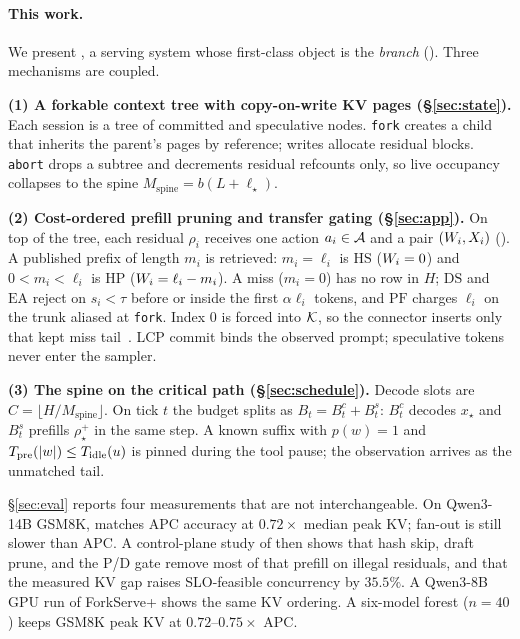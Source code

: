 \paragraph{This work.}
We present \sys, a serving system whose first-class object is the \emph{branch} ().
Three mechanisms are coupled.

\smallskip\noindent\textbf{(1) A forkable context tree with copy-on-write KV pages (\S\ref{sec:state}).}
Each session is a tree of committed and speculative nodes.
\texttt{fork} creates a child that inherits the parent's pages by reference; writes allocate residual blocks.
\texttt{abort} drops a subtree and decrements residual refcounts only, so live occupancy collapses to the spine $M_{\mathrm{spine}}=b(L+\ell_\star)$.

\smallskip\noindent\textbf{(2) Cost-ordered prefill pruning and transfer gating (\S\ref{sec:app}).}
On top of the tree, each residual $\rho_i$ receives one action $a_i\in\mathcal{A}$ and a pair $(W_i,X_i)$ ().
A published prefix of length $m_i$ is retrieved: $m_i=\ell_i$ is $\mathrm{HS}$ ($W_i=0$) and $0{<}m_i{<}\ell_i$ is $\mathrm{HP}$ ($W_i=\ell_i-m_i$).
A miss ($m_i=0$) has no row in $H$; $\mathrm{DS}$ and $\mathrm{EA}$ reject on $s_i{<}\tau$ before or inside the first $\alpha\ell_i$ tokens, and $\mathrm{PF}$ charges $\ell_i$ on the trunk aliased at \texttt{fork}.
Index $0$ is forced into $\mathcal{K}$, so the connector inserts only that kept miss tail~\cite{distserve,splitwise}.
LCP commit binds the observed prompt; speculative tokens never enter the sampler.

\smallskip\noindent\textbf{(3) The spine on the critical path (\S\ref{sec:schedule}).}
Decode slots are $C=\lfloor H/M_{\mathrm{spine}}\rfloor$.
On tick $t$ the budget splits as $B_t=B^c_t+B^s_t$: $B^c_t$ decodes $x_\star$ and $B^s_t$ prefills $\rho^{+}_{\star}$ in the same step.
A known suffix with $p(w){=}1$ and $T_{\mathrm{pre}}(|w|)\le T_{\mathrm{idle}}(u)$ is pinned during the tool pause; the observation arrives as the unmatched tail.

\S\ref{sec:eval} reports four measurements that are not interchangeable.
On Qwen3-14B GSM8K, \sys matches APC accuracy at $0.72\times$ median peak KV; fan-out is still slower than APC.
A control-plane study of \app then shows that hash skip, draft prune, and the P/D gate remove most of that prefill on illegal residuals, and that the measured KV gap raises SLO-feasible concurrency by $35.5\%$.
A Qwen3-8B GPU run of ForkServe+ shows the same KV ordering.
A six-model forest ($n{=}40$) keeps GSM8K peak KV at $0.72$--$0.75\times$ APC.
